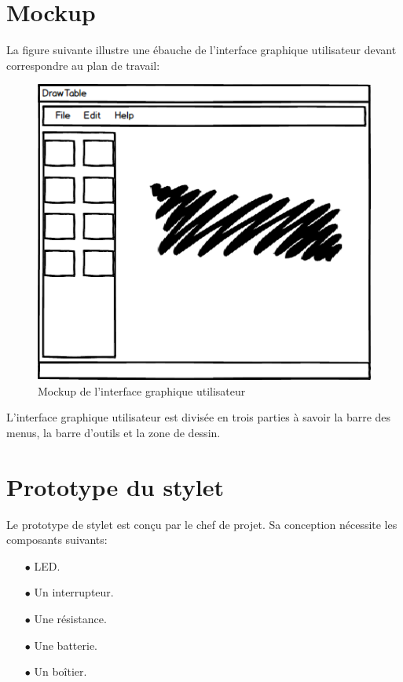\documentclass[11pt,a4paper,oldfontcommands]{memoir}
\begin{document}
\section{Mockup}

La figure suivante illustre une ébauche de l'interface graphique utilisateur devant correspondre au plan de travail:

\begin{figure}[h]
\centering
\includegraphics[scale=0.5]{images/ui.png}
\caption{Mockup de l'interface graphique utilisateur}
\end{figure}

L'interface graphique utilisateur est divisée en trois parties à savoir la barre des menus, la barre d'outils et la zone de dessin.

\section{Prototype du stylet}

Le prototype de stylet est conçu par le chef de projet. Sa conception nécessite les composants suivants:

\begin{itemize}
\item[$\bullet$] LED.
\item[$\bullet$] Un interrupteur.
\item[$\bullet$] Une résistance.
\item[$\bullet$] Une batterie.
\item[$\bullet$] Un boîtier.
\end{itemize}
\end{document}
